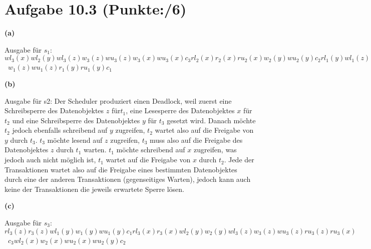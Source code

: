 \documentclass[11pt, a4paper]{article}
\newcommand{\blattnummer}{10}
\newcommand{\ppp}{6}
\newcommand{\aufgabe}[2] {\section*{Aufgabe \blattnummer.#1 (Punkte:\qquad/#2)}}
\newcommand{\aufgabenteil}[1] {\textbf{(#1)}}
\begin{document}
\aufgabe{3}{\ppp}
\aufgabenteil{a}
\begin{adjustwidth}{20pt}{20pt}
Ausgabe für $s_1$:\\
$wl_3(x) wl_2(y) wl_3(z) w_3(z) wu_3(z) w_3(x) wu_3(x) c_3 rl_2(x) r_2(x) ru_2(x) w_2(y) wu_2(y) c_2 rl_1(y) wl_1(z)$ \\ \ $ w_1(z) wu_1(z) r_1(y) ru_1(y) c_1$
\end{adjustwidth}
\aufgabenteil{b}
\begin{adjustwidth}{20pt}{20pt}Ausgabe für s2:
Der Scheduler produziert einen Deadlock, weil zuerst eine Schreibsperre des Datenobjektes $z$ für$t_1$, eine Lesesperre
des Datenobjektes $x$ für $t_2$ und eine Schreibsperre des Datenobjektes $y$ für $t_3$ gesetzt wird. Danach möchte $t_2$ jedoch
ebenfalls schreibend auf $y$ zugreifen, $t_2$ wartet also auf die Freigabe von $y$ durch $t_3$. $t_3$ möchte lesend auf $z$ 
zugreifen, $t_3$ muss also auf die Freigabe des Datenobjektes $z$ durch $t_1$ warten. $t_1$ möchte schreibend auf $x$ zugreifen,
was jedoch auch nicht möglich ist, $t_1$ wartet auf die Freigabe von $x$ durch $t_2$. 
Jede der Transaktionen wartet also auf die Freigabe eines bestimmten Datenobjektes durch eine der anderen Transaktionen
(gegenseitiges Warten), jedoch kann auch keine der Transaktionen die jeweils erwartete Sperre lösen.
\end{adjustwidth}
\aufgabenteil{c}
\begin{adjustwidth}{20pt}{20pt}
Ausgabe für $s_3$:\\
$rl_3(z) r_3(z) wl_1(y) w_1(y) wu_1(y) c_1 rl_3(x) r_3(x) wl_2(y) w_2(y) wl_3(z) w_3(z) wu_3(z) ru_3(z) ru_3(x) $ \\ \ $c_3 wl_2(x) w_2(x) wu_2(x) wu_2(y) c_2$
\end{adjustwidth}

\end{document}

